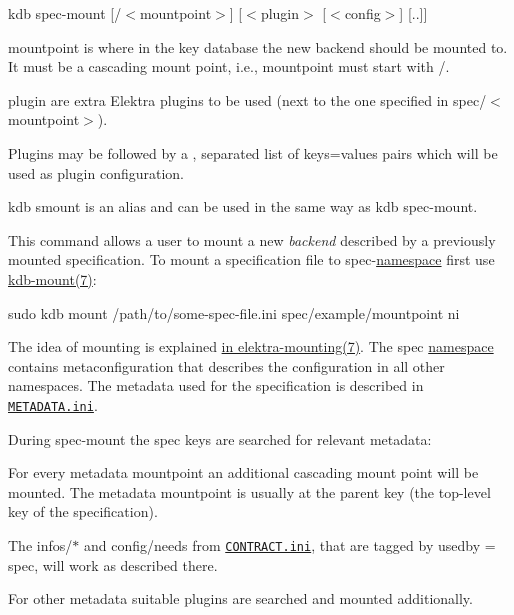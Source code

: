 {\ttfamily kdb spec-\/mount \mbox{[}/$<$mountpoint$>$\mbox{]} \mbox{[}$<$plugin$>$ \mbox{[}$<$config$>$\mbox{]} \mbox{[}..\mbox{]}\mbox{]}}


\begin{DoxyItemize}
\item {\ttfamily mountpoint} is where in the key database the new backend should be mounted to. It must be a cascading mount point, i.\+e., {\ttfamily mountpoint} must start with {\ttfamily /}.
\item {\ttfamily plugin} are extra Elektra plugins to be used (next to the one specified in {\ttfamily spec/$<$mountpoint$>$}).
\item Plugins may be followed by a {\ttfamily ,} separated list of {\ttfamily keys=values} pairs which will be used as plugin configuration.
\end{DoxyItemize}

{\ttfamily kdb smount} is an alias and can be used in the same way as {\ttfamily kdb spec-\/mount}.

This command allows a user to mount a new {\itshape backend} described by a previously mounted specification. To mount a specification file to {\ttfamily spec}-\/\hyperlink{doc_help_elektra-namespaces_md}{namespace} first use \hyperlink{doc_help_kdb-mount_md}{kdb-\/mount(7)}\+:


\begin{DoxyCode}
sudo kdb mount /path/to/some-spec-file.ini spec/example/mountpoint ni
\end{DoxyCode}


The idea of mounting is explained \hyperlink{doc_help_elektra-mounting_md}{in elektra-\/mounting(7)}. The {\ttfamily spec} \hyperlink{doc_help_elektra-namespaces_md}{namespace} contains metaconfiguration that describes the configuration in all other namespaces. The metadata used for the specification is described in \href{/home/jenkins/workspace/libelektra-release/doc/METADATA.ini}{\tt M\+E\+T\+A\+D\+A\+T\+A.\+ini}.

During {\ttfamily spec-\/mount} the {\ttfamily spec} keys are searched for relevant metadata\+:


\begin{DoxyItemize}
\item For every metadata {\ttfamily mountpoint} an additional cascading mount point will be mounted. The metadata {\ttfamily mountpoint} is usually at the parent key (the top-\/level key of the specification).
\item The {\ttfamily infos/$\ast$} and {\ttfamily config/needs} from \href{/home/jenkins/workspace/libelektra-release/doc/CONTRACT.ini}{\tt C\+O\+N\+T\+R\+A\+C\+T.\+ini}, that are tagged by {\ttfamily usedby = spec}, will work as described there.
\item For other metadata suitable plugins are searched and mounted additionally.
\end{DoxyItemize}

